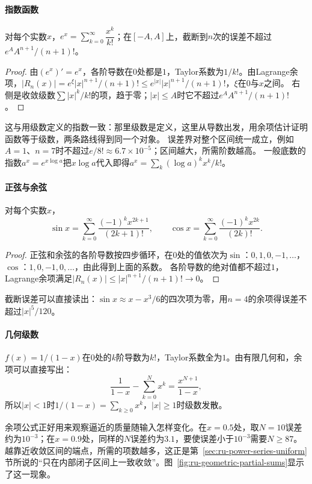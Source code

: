 \paragraph{指数函数}
\begin{theorem}[指数函数的展开]
\label{thm:ru-exp-series}
对每个实数$x$，$e^x=\sum_{k=0}^\infty\dfrac{x^k}{k!}$；在$[-A,A]$上，截断到$n$次的误差不超过$e^AA^{n+1}/(n+1)!$。
\end{theorem}
\begin{proof}
由$(e^x)'=e^x$，各阶导数在$0$处都是$1$，Taylor系数为$1/k!$。由Lagrange余项，$|R_n(x)|=e^\xi|x|^{n+1}/(n+1)!\leq e^{|x|}|x|^{n+1}/(n+1)!$，$\xi$在$0$与$x$之间。
右侧是收敛级数$\sum|x|^k/k!$的项，趋于零；$|x|\leq A$时它不超过$e^AA^{n+1}/(n+1)!$。
\end{proof}
这与用级数定义的指数一致：那里级数是定义，这里从导数出发，用余项估计证明函数等于级数，两条路线得到同一个对象。
误差界对整个区间统一成立，例如$A=1$、$n=7$时不超过$e/8!\approx6.7\times10^{-5}$；区间越大，所需阶数越高。
一般底数的指数$a^x=e^{x\log a}$把$x\log a$代入即得$a^x=\sum_k(\log a)^kx^k/k!$。

\paragraph{正弦与余弦}
\begin{theorem}[正弦与余弦的展开]
\label{thm:ru-trig-series}
对每个实数$x$，
\[
 \sin x=\sum_{k=0}^\infty\frac{(-1)^kx^{2k+1}}{(2k+1)!},\qquad\cos x=\sum_{k=0}^\infty\frac{(-1)^kx^{2k}}{(2k)!}.
\]
\end{theorem}
\begin{proof}
正弦和余弦的各阶导数按四步循环，在$0$处的值依次为$\sin$：$0,1,0,-1,\ldots$，$\cos$：$1,0,-1,0,\ldots$，由此得到上面的系数。
各阶导数的绝对值都不超过$1$，Lagrange余项满足$|R_n(x)|\leq|x|^{n+1}/(n+1)!\to0$。
\end{proof}
截断误差可以直接读出：$\sin x\approx x-x^3/6$的四次项为零，用$n=4$的余项得误差不超过$|x|^5/120$。

\paragraph{几何级数}
$f(x)=1/(1-x)$在$0$处的$k$阶导数为$k!$，Taylor系数全为$1$。由有限几何和，余项可以直接写出：
\[
 \frac1{1-x}-\sum_{k=0}^Nx^k=\frac{x^{N+1}}{1-x},
\]
所以$|x|<1$时$1/(1-x)=\sum_{k\geq0}x^k$，$|x|\geq1$时级数发散。

余项公式正好用来观察逼近的质量随输入怎样变化。在$x=0.5$处，取$N=10$误差约为$10^{-3}$；在$x=0.9$处，同样的$N$误差约为$3.1$，要使误差小于$10^{-3}$需要$N\geq87$。
越靠近收敛区间的端点，所需的项数越多，这正是第~\ref{sec:ru-power-series-uniform}节所说的“只在内部闭子区间上一致收敛”。图~\ref{fig:ru-geometric-partial-sums}显示了这一现象。

